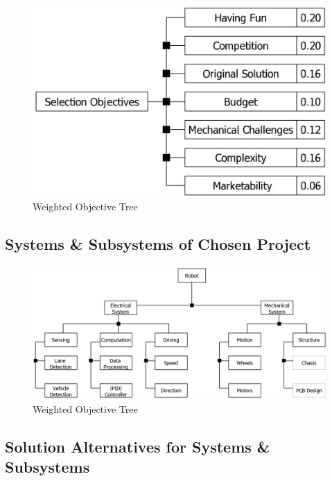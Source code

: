 \documentclass[a4paper,12pt]{article}
\begin{document}
	
	\begin{figure}[H]
		\centering
		\includegraphics[width=\textwidth,height=\textheight,keepaspectratio]{pre-objective-tree/pre-objective-tree} 
		\caption{\label{fig:objective_tree}Weighted Objective Tree}
	\end{figure}

	
	
	\subsection{Systems \& Subsystems of Chosen Project}	
	
	\begin{figure}[H]
		\centering
		\includegraphics[width=\textwidth,height=\textheight,keepaspectratio]{product-tree/product-tree} 
		\caption{\label{fig:product_tree}Weighted Objective Tree}
	\end{figure}

	\subsection{Solution Alternatives for Systems \& Subsystems }
	
\end{document}
